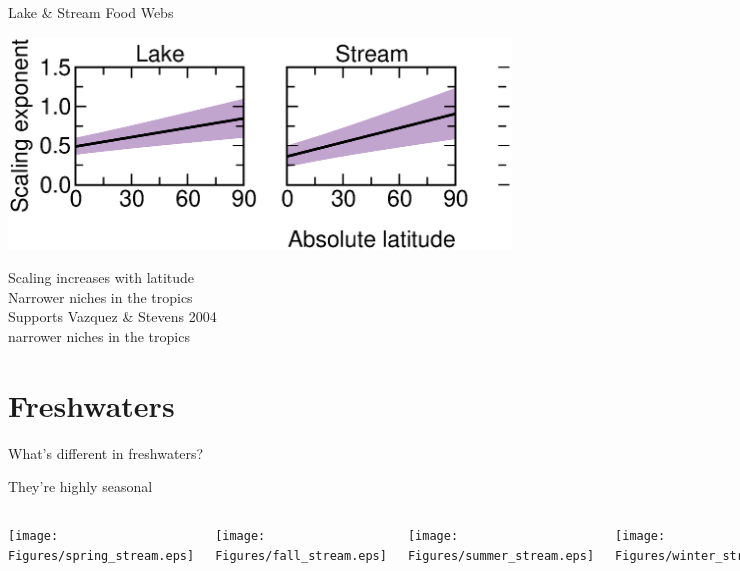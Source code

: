 \documentclass{beamer}
\begin{document}
  \begin{frame}{Lake \& Stream Food Webs}
    \begin{center}
      \includegraphics*[width=.75\textwidth]{Figures/results/effect.eps}

      \vspace{1cm}
      Scaling increases with latitude\\
      Narrower niches in the tropics\\
      \vspace{.54cm}
      Supports Vazquez \& Stevens 2004\\
      {\color{white} narrower niches in the tropics}

    \end{center}
  \end{frame}

\section*{Freshwaters}

  \begin{frame}{What's different in freshwaters?}
    \begin{block}{They're highly seasonal}

      \begin{columns}
        \column{.5in}
        \column{1.9in}

        \hfill \texttt{[image: Figures/spring\_stream.eps]}

        \vspace{.2in}

        \hfill \texttt{[image: Figures/fall\_stream.eps]}

        \column{.2in}

        \column{1.9in}

        \texttt{[image: Figures/summer\_stream.eps]}

        \vspace{.2in}

        \texttt{[image: Figures/winter\_stream.eps]}

        \column{.5in}

      \end{columns}
    \end{block}

    \vfill

  \end{frame}
\end{document}
